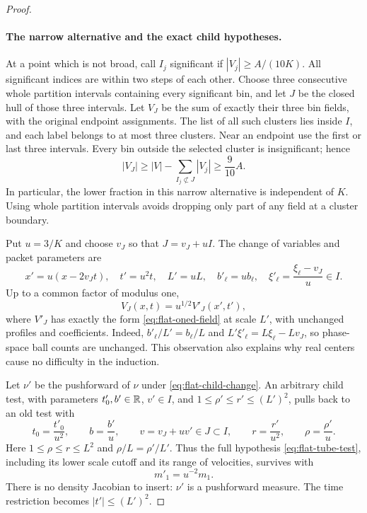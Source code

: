 \begin{proof}
\paragraph{The narrow alternative and the exact child hypotheses.}
At a point which is not broad, call $I_j$ significant if
$|V_j|\geq A/(10K)$.  All significant indices are within two steps
of each other.  Choose three consecutive whole partition intervals
containing every significant bin, and let $J$ be the closed hull of
those three intervals.  Let $V_J$ be the sum of exactly their three
bin fields, with the original
endpoint assignments.  The list of all such clusters lies inside
$I$, and each label belongs to at most three clusters.  Near an
endpoint use the first or last three intervals.  Every bin outside
the selected cluster is insignificant; hence
\begin{equation}\label{eq:flat-narrow-level}
 |V_J|\geq |V|-\sum_{I_j\not\subset J}|V_j|
                 \geq\frac9{10}A.
\end{equation}
In particular, the lower fraction in this narrow alternative is
independent of $K$.  Using whole partition intervals avoids dropping
only part of any field at a cluster boundary.

Put $u=3/K$ and choose $v_J$ so that $J=v_J+uI$.
The change of variables and packet parameters are
\begin{equation}\label{eq:flat-child-change}
 x'=u(x-2v_Jt),\quad t'=u^2t,\quad L'=uL,
 \quad b'_\ell=ub_\ell,\quad
 \xi'_\ell=\frac{\xi_\ell-v_J}{u}\in I.
\end{equation}
Up to a common factor of modulus one,
\begin{equation}\label{eq:flat-child-normalization}
 V_J(x,t)=u^{1/2}V'_J(x',t'),
\end{equation}
where $V'_J$ has exactly the form \eqref{eq:flat-oned-field} at scale
$L'$, with unchanged profiles and coefficients.  Indeed,
$b'_\ell/L'=b_\ell/L$ and
$L'\xi'_\ell=L\xi_\ell-Lv_J$, so phase-space ball counts are
unchanged.  This observation also explains why real centers cause
no difficulty in the induction.

Let $\nu'$ be the pushforward of $\nu$ under
\eqref{eq:flat-child-change}.  An arbitrary child test, with parameters
$t'_0,b'\in\mathbb R$, $v'\in I$, and
$1\leq\rho'\leq r'\leq(L')^2$, pulls back to
an old test with
\[
 t_0=\frac{t'_0}{u^2},\qquad b=\frac{b'}u,\qquad
 v=v_J+uv'\in J\subset I,\qquad
 r=\frac{r'}{u^2},\qquad \rho=\frac{\rho'}u.
\]
Here $1\leq\rho\leq r\leq L^2$ and
$\rho/L=\rho'/L'$.  Thus the full hypothesis
\eqref{eq:flat-tube-test}, including its lower scale cutoff and its
range of velocities, survives with
\begin{equation}\label{eq:flat-child-measure}
 m'_1=u^{-2}m_1.
\end{equation}
There is no density Jacobian to insert: $\nu'$ is a pushforward
measure.  The time restriction becomes $|t'|\leq(L')^2$.


\end{proof}
